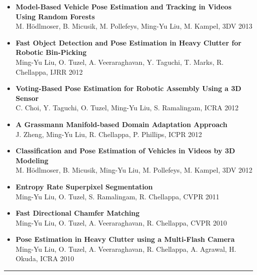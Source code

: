 \documentclass[10pt,letterpaper]{article}
\begin{document}
\begin{itemize}
      {Ming-Yu Liu}, O. Tuzel, S. Ramalingam, R. Chellappa, {TPAMI} 2014\vspace{-2mm}
\item {\bf Model-Based Vehicle Pose Estimation and Tracking in Videos Using Random Forests}\\
      M. Hödlmoser, B. Micusik, M. Pollefeys, {Ming-Yu Liu}, M. Kampel, {3DV} 2013\vspace{-2mm}
\item {\bf Fast Object Detection and Pose Estimation in Heavy Clutter for Robotic Bin-Picking}\\      
			{Ming-Yu Liu}, O. Tuzel, A. Veeraraghavan, Y. Taguchi, T. Marks, R. Chellappa, {IJRR} 2012\vspace{-2mm}
\item {\bf Voting-Based Pose Estimation for Robotic Assembly Using a 3D Sensor}\\
      C. Choi, Y. Taguchi, O. Tuzel, {Ming-Yu Liu}, S. Ramalingam, {ICRA} 2012\vspace{-2mm}
\item {\bf A Grassmann Manifold-based Domain Adaptation Approach}\\
			J. Zheng, {Ming-Yu Liu}, R. Chellappa, P. Phillips, {ICPR} 2012\vspace{-2mm}
\item {\bf Classification and Pose Estimation of Vehicles in Videos by 3D Modeling}\\%
      M. Hödlmoser, B. Micusik, {Ming-Yu Liu}, M. Pollefeys, M. Kampel, {3DV} 2012\vspace{-2mm}
\item {\bf Entropy Rate Superpixel Segmentation}\\                
			{Ming-Yu Liu}, O. Tuzel, S. Ramalingam, R. Chellappa, CVPR 2011\vspace{-2mm}
\item {\bf Fast Directional Chamfer Matching}\\                
			{Ming-Yu Liu}, O. Tuzel, A. Veeraraghavan, R. Chellappa, CVPR 2010\vspace{-2mm}
\item {\bf Pose Estimation in Heavy Clutter using a Multi-Flash Camera}\\
      {Ming-Yu Liu}, O. Tuzel, A. Veeraraghavan, R. Chellappa, A. Agrawal, H. Okuda, ICRA 2010\vspace{-2mm}
\end{itemize}
\hrule
\vspace{-0.4em}
\end{document}
